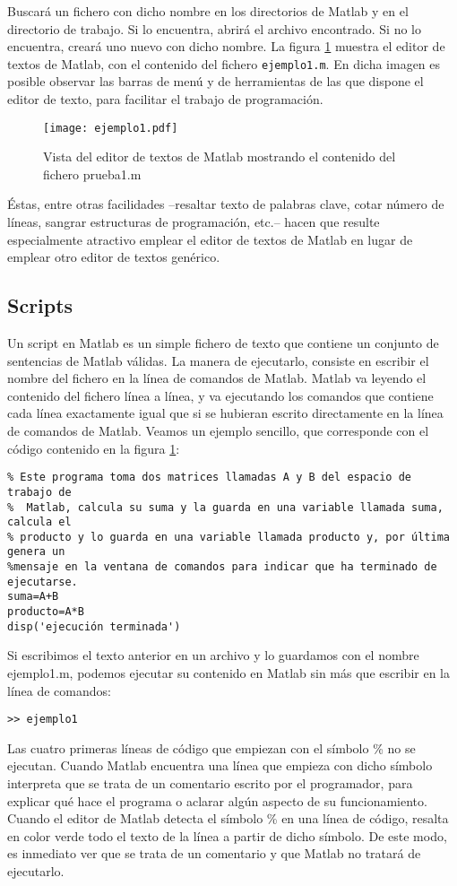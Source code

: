 Buscará un fichero con dicho nombre en los directorios de Matlab y en el directorio de trabajo. Si lo encuentra, abrirá el archivo encontrado. Si no lo encuentra, creará uno nuevo con dicho nombre. La figura \ref{fig:edv} muestra el editor de textos de Matlab, con el contenido del fichero \texttt{ejemplo1.m}. En dicha imagen es posible observar las barras de menú y de herramientas de las que dispone el editor de texto, para facilitar el trabajo de programación. 
\begin{figure}[h]
\centering
\texttt{[image: ejemplo1.pdf]}
\caption{Vista del editor de textos de Matlab mostrando el contenido del fichero prueba1.m}
\label{fig:edv}
\end{figure}
Éstas, entre otras facilidades --resaltar texto de palabras clave, cotar número de líneas, sangrar estructuras de programación, etc.-- hacen que resulte especialmente atractivo emplear el editor de textos de Matlab en lugar de emplear otro editor de textos genérico.

\subsection{Scripts} 
Un script en Matlab es un simple fichero de texto que contiene un conjunto de sentencias de Matlab válidas. La manera de ejecutarlo, consiste en escribir el nombre del fichero en la línea de comandos de Matlab. Matlab va leyendo el contenido del fichero línea a línea, y va ejecutando los comandos que contiene cada línea exactamente igual que si se hubieran escrito directamente en la línea de comandos de Matlab. Veamos un ejemplo sencillo, que corresponde con el código contenido en la figura \ref{fig:edv}:
\begin{verbatim}
% Este programa toma dos matrices llamadas A y B del espacio de trabajo de
%  Matlab, calcula su suma y la guarda en una variable llamada suma, calcula el 
% producto y lo guarda en una variable llamada producto y, por última genera un 
%mensaje en la ventana de comandos para indicar que ha terminado de ejecutarse.
suma=A+B
producto=A*B
disp('ejecución terminada') 
\end{verbatim}
Si escribimos el texto anterior en un archivo y lo guardamos con el nombre ejemplo1.m, podemos ejecutar su contenido en Matlab sin más que escribir en la línea de comandos:
\begin{verbatim}
>> ejemplo1
\end{verbatim}

Las cuatro primeras líneas de código que empiezan con el símbolo \% no se ejecutan. Cuando Matlab encuentra una línea que empieza con dicho símbolo interpreta que se trata de un comentario escrito por el programador, para explicar qué hace el programa o aclarar algún aspecto de su funcionamiento. Cuando el editor de Matlab detecta el símbolo \% en una línea de código, resalta en color verde todo el texto de la línea a partir de dicho símbolo. De este modo, es inmediato ver que se trata de un comentario y que Matlab no tratará de ejecutarlo.

